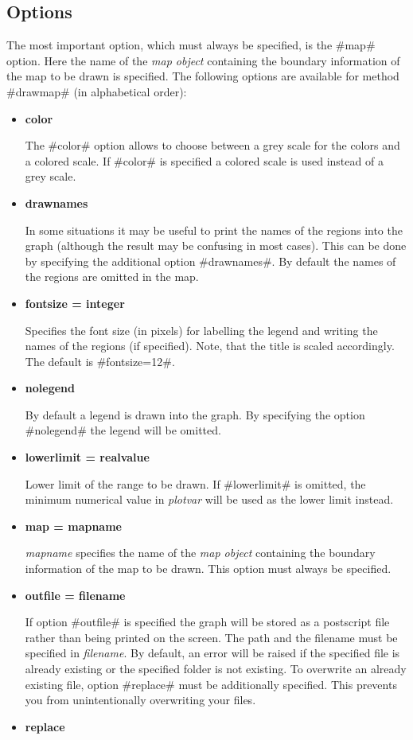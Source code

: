 \subsection*{Options}

The most important option, which must always be specified,  is the
#map# option. Here the name of the {\em map object} containing the
boundary information of the map to be drawn is specified. The
following options are available for method #drawmap# (in
alphabetical order):

\begin{itemize}
\item {\bf color}

The #color# option allows to choose between a grey scale for the
colors and a colored scale. If #color# is specified a colored
scale is used instead of a grey scale. \item {\bf drawnames}

In some situations it may be useful to print the names of the
regions into the graph (although the result may be confusing in
most cases). This can be done by specifying the additional option
#drawnames#. By default the names of the regions are omitted in
the map.
\item {\bf fontsize = integer}

Specifies the font size (in pixels) for labelling the legend and
writing the names of the regions (if specified). Note, that the
title is scaled accordingly. The default is #fontsize=12#.
\item {\bf nolegend}

By default a legend is drawn into the graph. By specifying the
option #nolegend# the legend will be omitted. \item {\bf
lowerlimit = realvalue}

Lower limit of the range to be drawn. If #lowerlimit# is omitted,
the minimum numerical value in {\em plotvar} will be used as the
lower limit instead.
\item {\bf map = mapname}

{\em mapname} specifies the name of the {\em map object}
containing the boundary information of the map to be drawn. This
option must always be specified.
\item {\bf outfile = filename}

If option #outfile# is specified the graph will be stored as a
postscript file rather than being printed on the screen. The path
and the filename must be specified in {\em filename}. By
default, an error will be raised if the specified file  is already
existing or the specified folder is not existing. To overwrite  an
already existing file, option #replace# must be additionally
specified. This prevents you from unintentionally overwriting your
files. \item {\bf replace}


\end{itemize}

